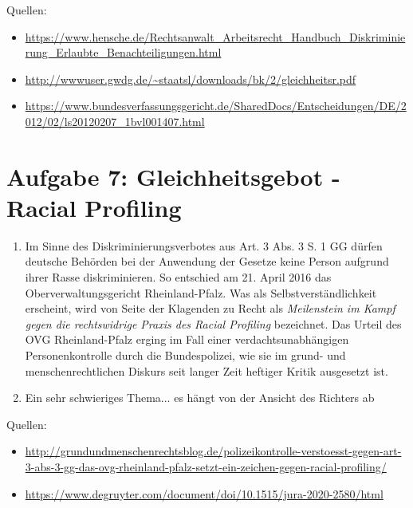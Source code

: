 \documentclass{article}
\begin{document}
	Quellen:
	\begin{itemize}
		\item \url{https://www.hensche.de/Rechtsanwalt_Arbeitsrecht_Handbuch_Diskriminierung_Erlaubte_Benachteiligungen.html}
		\item \url{http://wwwuser.gwdg.de/~staatsl/downloads/bk/2/gleichheitsr.pdf}
		\item \url{https://www.bundesverfassungsgericht.de/SharedDocs/Entscheidungen/DE/2012/02/ls20120207_1bvl001407.html}
	\end{itemize}
	
	\section*{Aufgabe 7: Gleichheitsgebot - Racial Profiling}
	\begin{enumerate}[label=(\alph*)]
		\item Im Sinne des Diskriminierungsverbotes aus Art. 3 Abs. 3 S. 1 GG dürfen deutsche Behörden bei der Anwendung der Gesetze keine Person aufgrund ihrer Rasse diskriminieren. So entschied am 21. April 2016 das Oberverwaltungsgericht Rheinland-Pfalz. Was als Selbstverständlichkeit erscheint, wird von Seite der Klagenden zu Recht als \textit{Meilenstein im Kampf gegen die rechtswidrige Praxis des Racial Profiling} bezeichnet. Das Urteil des OVG Rheinland-Pfalz erging im Fall einer verdachtsunabhängigen Personenkontrolle durch die Bundespolizei, wie sie im grund- und menschenrechtlichen Diskurs seit langer Zeit heftiger Kritik ausgesetzt ist.
		\item Ein sehr schwieriges Thema... es hängt von der Ansicht des Richters ab
	\end{enumerate}

	Quellen:
	\begin{itemize}
		\item \url{http://grundundmenschenrechtsblog.de/polizeikontrolle-verstoesst-gegen-art-3-abs-3-gg-das-ovg-rheinland-pfalz-setzt-ein-zeichen-gegen-racial-profiling/}
		\item \url{https://www.degruyter.com/document/doi/10.1515/jura-2020-2580/html}
	\end{itemize}
	
\end{document}
